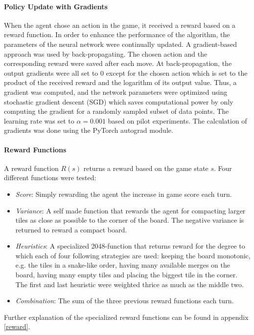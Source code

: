 \documentclass[11pt, fleqn]{article}
\begin{document}
\paragraph*{Policy Update with Gradients}
When the agent chose an action in the game, it received a reward based on a reward function. In order to enhance the performance of the algorithm, the parameters of the neural network were continually updated. A gradient-based approach was used by back-propagating. The chosen action and the corresponding reward were saved after each move. At back-propagation, the output gradients were all set to 0 except for the chosen action which is set to the product of the received reward and the logarithm of its output value. Thus, a gradient was computed, and the network parameters were optimized using stochastic gradient descent (SGD) which saves computational power by only computing the gradient for a randomly sampled subset of data points. The learning rate was set to $\alpha=0.001$ based on pilot experiments. The calculation of gradients was done using the PyTorch autograd module. 
\paragraph*{Reward Functions} A reward function $R(s)$ returns a reward based on the game state $s$.  Four different functions were tested:
\begin{itemize}
	\item \textit{Score}: Simply rewarding the agent the increase in game score each turn.
	\item \textit{Variance}: A self made function that rewards the agent for compacting larger tiles as close as possible to the corner of the board. The negative variance is returned to reward a compact board.
	\item \textit{Heuristics}: A specialized 2048-function that returns reward for the degree to which each of four following strategies are used: keeping the board monotonic, e.g. the tiles in a snake-like order, having many available merges on the board, having many empty tiles and placing the biggest tile in the corner. The first and last heuristic were weighted thrice as much as the middle two.
	\item \textit{Combination}: The sum of the three previous reward functions each turn.
\end{itemize}
Further explanation of the specialized reward functions can be found in appendix \ref{reward}.
\end{document}
